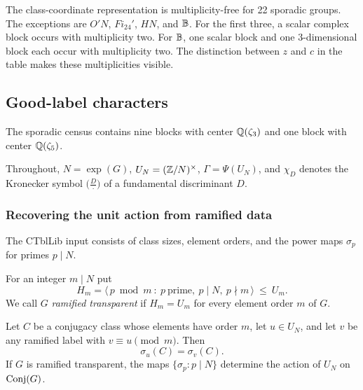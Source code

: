 The class-coordinate representation is multiplicity-free for 22 sporadic
groups.  The exceptions are $O'N$, $Fi_{24}'$, $HN$, and $\mathbb B$.
For the first three, a scalar complex block occurs with multiplicity two.
For $\mathbb B$, one scalar block and one $3$-dimensional block each occur
with multiplicity two.  The distinction between $z$ and $c$ in the table
makes these multiplicities visible.

\subsection{Good-label characters}
\label{sec:characters}

The sporadic census contains nine blocks with center \(\mathbb Q(\zeta_3)\) and
one block with center \(\mathbb Q(\zeta_5)\).

Throughout, \(N=\exp(G)\), \(U_N=(\mathbb Z/N)^\times\), \(\Gamma=\Psi(U_N)\), and
\(\chi_D\) denotes the Kronecker symbol \(\bigl(\tfrac D\cdot\bigr)\) of a
fundamental discriminant \(D\).

\subsubsection{Recovering the unit action from ramified data}

The CTblLib input consists of class sizes, element orders, and the power
maps \(\sigma_p\) for primes \(p\mid N\).

\begin{definition}
\label{def:witness-subgroup}
For an integer \(m\mid N\) put
\begin{equation}
 H_m=\bigl\langle\,p\bmod m\ :\ p\ \text{prime},\ p\mid N,\ p\nmid m\,\bigr\rangle
 \ \leq\ U_m .
 \label{eq:witness-subgroup}
\end{equation}
We call \(G\) \emph{ramified transparent} if \(H_m=U_m\) for every element
order \(m\) of \(G\).
\end{definition}

\begin{theorem}
\label{thm:unit-reconstruction}
Let \(C\) be a conjugacy class whose elements have order \(m\), let
\(u\in U_N\), and let \(v\) be any ramified label with \(v\equiv u\pmod m\).
Then
\begin{equation}
 \sigma_u(C)=\sigma_v(C).
 \label{eq:unit-reconstruction}
\end{equation}
If \(G\) is ramified transparent, the maps
\(\{\sigma_p:p\mid N\}\) determine the action of \(U_N\) on \(\operatorname{Conj}(G)\).
\end{theorem}

